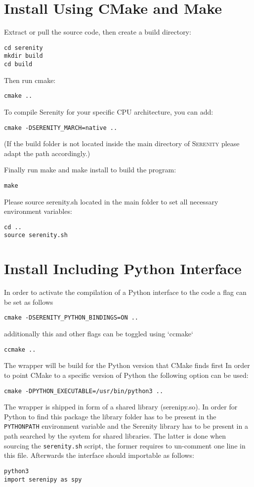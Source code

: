 \documentclass[bibliography=totocnumbered,a4paper,10pt,oneside]{scrbook}
\begin{document}
\section{Install Using CMake and Make}

Extract or pull the source code, then create a build directory:
\begin{lstlisting}
cd serenity
mkdir build
cd build
\end{lstlisting}
Then run cmake:
\begin{lstlisting}
cmake ..
\end{lstlisting}
To compile Serenity for your specific CPU architecture, you can add:
\begin{lstlisting}
cmake -DSERENITY_MARCH=native ..
\end{lstlisting}
(If the build folder is not located inside the main directory of \textsc{Serenity}
please adapt the path accordingly.)

Finally run make and make install to build the program:
\begin{lstlisting}
make
\end{lstlisting}
Please source serenity.sh located in the main folder to set all necessary environment
variables:
\begin{lstlisting}
cd ..
source serenity.sh
\end{lstlisting}
\section{Install Including Python Interface}
In order to activate the compilation of a Python interface to the code
a flag can be set as follows
\begin{lstlisting}
cmake -DSERENITY_PYTHON_BINDINGS=ON ..
\end{lstlisting}
additionally this and other flags can be toggled using `ccmake`
\begin{lstlisting}
ccmake ..
\end{lstlisting}
The wrapper will be build for the Python version that CMake finds first
In order to point CMake to a specific version of Python the following
option can be used:
\begin{lstlisting}
cmake -DPYTHON_EXECUTABLE=/usr/bin/python3 ..
\end{lstlisting}
The wrapper is shipped in form of a shared library (serenipy.so).
In order for Python to find this package the library folder has to be present
in the \texttt{PYTHONPATH} environment variable and the Serenity library has to be
present in a path searched by the system for shared libraries.
The latter is done when sourcing the \texttt{serenity.sh} script, the former requires
to un-comment one line in this file.
Afterwards the interface should importable as follows:
\begin{lstlisting}
python3
import serenipy as spy
\end{lstlisting}
\end{document}
